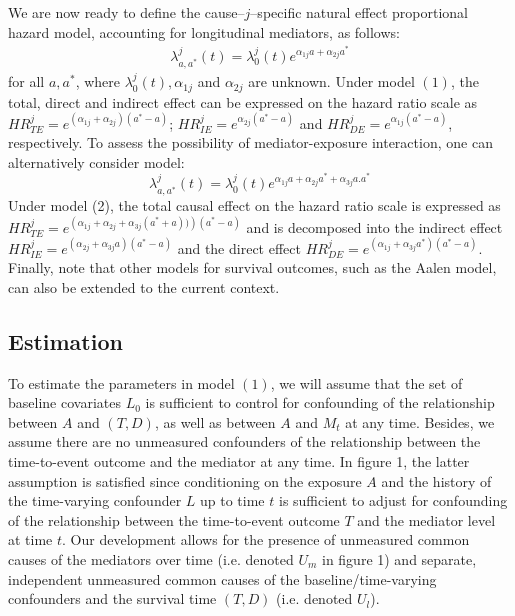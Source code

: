\documentclass[AMA,STIX1COL]{WileyNJD-v2}
\begin{document}
We are now ready to define the cause--$j$--specific natural effect proportional hazard model, accounting for longitudinal mediators, as follows:
 \begin{align}
\lambda^j_{a, a^*}(t) = \lambda_0^j(t)e^{\alpha_{1j}a + \alpha_{2j}a^*}
\end{align}
for all $a,a^*$, where $\lambda_0^j(t), \alpha_{1j}$ and $\alpha_{2j}$ are unknown. Under model $(1)$, the total, direct and indirect effect can be expressed on the hazard ratio scale as $HR^j_{TE} = e^{(\alpha_{1j}+\alpha_{2j})(a^* - a)}$; $HR^j_{IE} = e^{\alpha_{2j}(a^* - a)}$ and $HR^j_{DE} = e^{\alpha_{1j}(a^* - a)}$, 
respectively. To assess the possibility of mediator-exposure interaction, one can alternatively consider model:
 \begin{equation}\label{eq:model}
\lambda^j_{a, a^*}(t) = \lambda_0^j(t)e^{\alpha_{1j}a + \alpha_{2j}a^* + \alpha_{3j}a.a^*}
\end{equation}
Under model (2), the total causal effect on the hazard ratio scale is expressed as $HR^j_{TE} = e^{\left(\alpha_{1j}+\alpha_{2j} + \alpha_{3j}(a^*+a))\right)(a^* - a)}$ and is decomposed into the indirect effect $ HR^j_{IE} = e^{(\alpha_{2j} + \alpha_{3j}a)(a^* - a)}$ and the direct effect $HR^j_{DE} = e^{(\alpha_{1j} + \alpha_{3j}a^*)(a^* - a)}$. Finally, note that other models for survival outcomes, such as the Aalen model, can also be extended to the current context.
\subsection{Estimation}
To estimate the parameters in model $(1)$, we will assume that the set of baseline covariates $L_0$ is sufficient to control for confounding of the relationship between $A$ and $(T,D)$, as well as between $A$ and $M_t$ at any time. Besides, we assume there are no unmeasured confounders of the relationship between the time-to-event outcome and the mediator at any time. In figure 1, the latter assumption is satisfied since conditioning on the exposure $A$ and the history of the time-varying confounder $L$ up to time $t$ is sufficient to adjust for confounding of the relationship between the time-to-event outcome $T$ and the mediator level at time $t$. Our development allows for the presence of unmeasured common causes of the mediators over time (i.e. denoted $U_m$ in figure 1) and separate, independent unmeasured common causes of the baseline/time-varying confounders and the survival time $(T,D)$ (i.e. denoted $U_l$).
\end{document}
